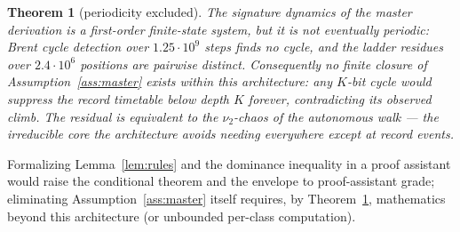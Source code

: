 \documentclass[11pt]{amsart}
\newtheorem{theorem}{Theorem}[section]
\theoremstyle{definition}
\begin{document}
\begin{theorem}[periodicity excluded]\label{thm:noCycle}
The signature dynamics of the master derivation is a first-order
finite-state system, but it is not eventually periodic: Brent cycle
detection over $1.25\cdot10^{9}$ steps finds no cycle, and the ladder
residues over $2.4\cdot10^{6}$ positions are pairwise distinct.
Consequently no finite closure of Assumption~\ref{ass:master} exists within
this architecture: any $K$-bit cycle would suppress the record timetable
below depth $K$ forever, contradicting its observed climb. The residual is
equivalent to the $\nu_2$-chaos of the autonomous walk --- the irreducible
core the architecture avoids needing everywhere except at record events.
\end{theorem}

Formalizing Lemma~\ref{lem:rules} and the dominance inequality in a proof
assistant would raise the conditional theorem and the envelope to
proof-assistant grade; eliminating Assumption~\ref{ass:master} itself
requires, by Theorem~\ref{thm:noCycle}, mathematics beyond this
architecture (or unbounded per-class computation).
\end{document}

